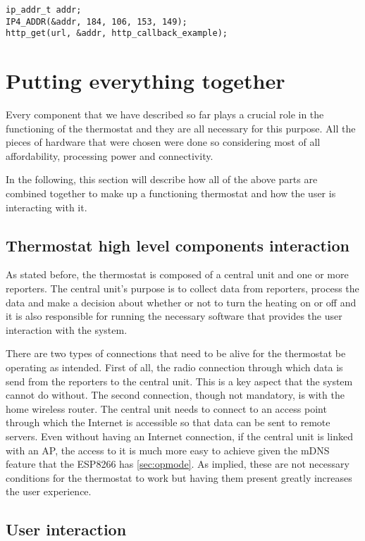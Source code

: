 \begin{lstlisting}[frame=single]
ip_addr_t addr;
IP4_ADDR(&addr, 184, 106, 153, 149);
http_get(url, &addr, http_callback_example);
\end{lstlisting}


\section{Putting everything together}
\label{sec:toghether}

Every component that we have described so far plays a crucial role in the functioning of the thermostat and
they are all necessary for this purpose. All the pieces of hardware that were chosen were done so considering
most of all affordability, processing power and connectivity.

In the following, this section will describe how all of the above parts are combined together to make up
a functioning thermostat and how the user is interacting with it.

\subsection{Thermostat high level components interaction}

As stated before, the thermostat is composed of a central unit and one or more reporters. The central unit's
purpose is to collect data from reporters, process the data and make a decision about whether or not to turn
the heating on or off and it is also responsible for running the necessary software that provides the user
interaction with the system.

There are two types of connections that need to be alive for the thermostat be operating as intended.
First of all, the radio connection through which data is send from the reporters to the central unit. This is
a key aspect that the system cannot do without.
The second connection, though not mandatory, is with the home wireless router. The central unit needs to
connect to an access point through which the Internet is accessible so that data can be sent to remote
servers. Even without having an Internet connection, if the central unit is linked with an AP, the access to
it is much more easy to achieve given the mDNS feature that the ESP8266 has \ref{sec:opmode}. As implied,
these are not necessary conditions for the thermostat to work but having them present greatly increases the
user experience.

\subsection{User interaction}

